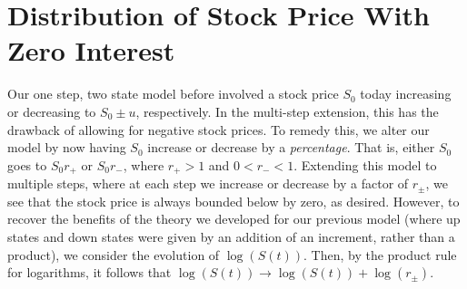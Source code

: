 \documentclass[12pt]{amsbook}
\theoremstyle{plain}
\theoremstyle{definition}
\theoremstyle{remark}
\numberwithin{equation}{section}  %
\begin{document}
\section{Distribution of Stock Price With Zero Interest}
Our one step, two state model before involved a stock price $S_{0}$ today
increasing or decreasing to $S_{0} \pm u$, respectively. In the multi-step
extension, this has the drawback of allowing for negative stock prices. 
To remedy this, we alter our model by now having $S_{0}$ increase or decrease by a \emph{percentage}.
That is, either $S_{0}$  goes to $S_{0}r_{+}$  or $S_{0}r_{-}$, where
$r_{+} > 1$  and $0 < r_{-} < 1$. Extending this model to multiple
steps, where at each step we increase or decrease by a factor of $r_{\pm}$,
we see that the stock price is always bounded below by zero, as desired.
However, to recover the benefits of the theory we developed for our previous
model (where up states and down states were given by an addition of an
increment, rather than a product), we
consider the evolution of  $\log(S(t))$. Then, by the product rule for logarithms,
it follows that $\log(S(t)) \to \log(S(t)) + \log(r_{\pm})$.
\end{document}
